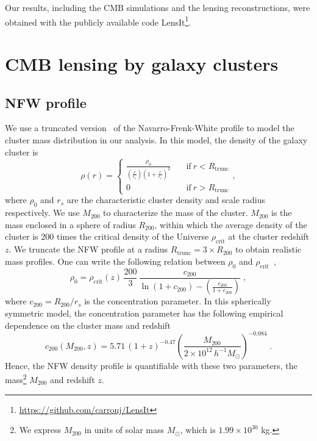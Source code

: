 \documentclass[prd, superscriptaddress, tightenlines, longbibliography, nofootinbib, eqsecnum, amsfonts, amsmath, floatfix, twocolumn, notitlepage]{revtex4-2}
\begin{document}
Our results, including the CMB simulations and the lensing reconstructions, were obtained with the publicly available code LensIt\footnote[1]{\url{https://github.com/carronj/LensIt}}.


\section{CMB lensing by galaxy clusters}
\label{sec:model}

\subsection{NFW profile}

We use a truncated version~\cite{Zubeldia:2019brr} of the Navarro-Frenk-White profile \cite[NFW,][]{Navarro:1995iw} to model the cluster mass distribution in our analysis. In this model, the density of the galaxy cluster is
\begin{equation}\label{eq:NFW}
    \rho(r) = \begin{cases} \displaystyle 
               \frac{\rho_0}{(\frac{r}{r_s})(1+\frac{r}{r_s})^2} &\quad \text{if} \ r < R_{\text{trunc}} \\
               0  &\quad \text{if} \ r > R_{\text{trunc}}
               \end{cases},
\end{equation}
where $\rho_0$ and $r_s$ are the characteristic cluster density and scale radius respectively. 
We use $M_{200}$ to characterize the mass of the cluster. $M_{200}$ is the mass enclosed in a sphere of radius $R_{200}$, within which the average density of the cluster is $200$ times the critical density of the Universe $\rho_{\text{crit}}$ at the cluster redshift $z$.
We truncate the NFW profile at a radius $R_{\text{trunc}} = 3\times R_{200}$ to obtain realistic mass profiles.
One can write the following relation between $\rho_0$ and $\rho_{\text{crit}}$~\cite{Oguri_2011},
\begin{equation}\label{eq:rho_0}
    \rho_0 = \rho_{\text{crit}}(z) \,  \frac{200}{3} \,  \frac{c_{200}}{ \displaystyle \ln{(1+c_{200})}-\left(\frac{c_{200}}{1+c_{200}}\right)} \; ,
\end{equation}
where $c_{200} = R_{200}/r_s$ is the concentration parameter. In this spherically symmetric model, the concentration parameter has the following empirical dependence on the cluster mass and redshift \cite{Duffy:2008pz, Geach:2017crt}
\begin{equation}\label{eq:c200}
    c_{200}(M_{200}, z) = 5.71 \, (1+z)^{-0.47} \left(\frac{M_{200}}{2\times10^{12} \, h^{-1}M_{\odot}}\right)^{-0.084} \; .
\end{equation}
Hence, the NFW density profile is quantifiable with these two parameters, the mass\footnote[2]{We express $M_{200}$ in units of solar mass $M_{\odot}$, which is $1.99 \times 10^{30}$ kg.} $M_{200}$ and redshift $z$.
\end{document}
